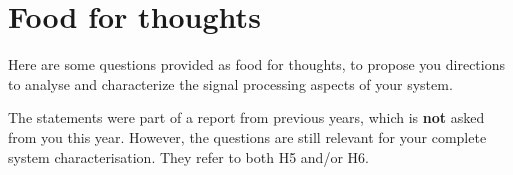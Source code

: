 %
%

\section{Food for thoughts}

Here are some questions provided as food for thoughts, to propose you directions to analyse and characterize the signal processing aspects of your system.

The statements were part of a report from previous years, which is \textbf{not} asked from you this year. However, the questions are still relevant for your complete system characterisation.
They refer to both H5 and/or H6.

